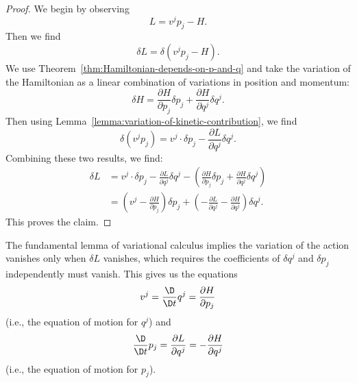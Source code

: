 \begin{proof}
  We begin by observing
  \begin{equation}
L = v^{j}p_{j} - H.
  \end{equation}
  Then we find
  \begin{equation}
\delta L = \delta(v^{j}p_{j} - H).
  \end{equation}
  We use Theorem~\ref{thm:Hamiltonian-depends-on-p-and-q} and take the variation of the Hamiltonian as a linear combination of
  variations in position and momentum:
  \begin{equation}
\delta H = \frac{\partial H}{\partial p_{j}}\delta p_{j} +
\frac{\partial H}{\partial q^{j}}\delta q^{j}.
  \end{equation}
  Then using Lemma~\ref{lemma:variation-of-kinetic-contribution}, we find
  \begin{equation}
\delta(v^{j}p_{j}) =  v^{j}\cdot\delta p_{j} -\frac{\partial L}{\partial q^{j}}\delta q^{j}.
  \end{equation}
  Combining these two results, we find:
  \begin{subequations}
 \begin{align}
\delta L &= v^{j}\cdot\delta p_{j} -\frac{\partial L}{\partial
  q^{j}}\delta q^{j} - \left(\frac{\partial H}{\partial p_{j}}\delta p_{j} +
\frac{\partial H}{\partial q^{j}}\delta q^{j}\right)\\
&= \left(v^{j} - \frac{\partial H}{\partial p_{j}}\right)\delta p_{j} +
\left(-\frac{\partial L}{\partial q^{j}}-\frac{\partial H}{\partial q^{j}}\right)\delta q^{j}.
 \end{align}
  \end{subequations}
  This proves the claim.
\end{proof}


\begin{corollary}
The fundamental lemma of variational calculus implies the variation of
the action vanishes only when $\delta L$ vanishes, which requires the
coefficients of $\delta q^{j}$ and $\delta p_{j}$ independently must
vanish. This gives us the equations
\begin{equation}
v^{j} = \frac{\D}{\D t}q^{j} = \frac{\partial H}{\partial p_{j}}
\end{equation}
(i.e., the equation of motion for $q^{j}$) and
\begin{equation}
\frac{\D}{\D t}p_{j} = \frac{\partial L}{\partial q^{j}}=-\frac{\partial H}{\partial q^{j}}
\end{equation}
(i.e., the equation of motion for $p_{j}$).
\end{corollary}

